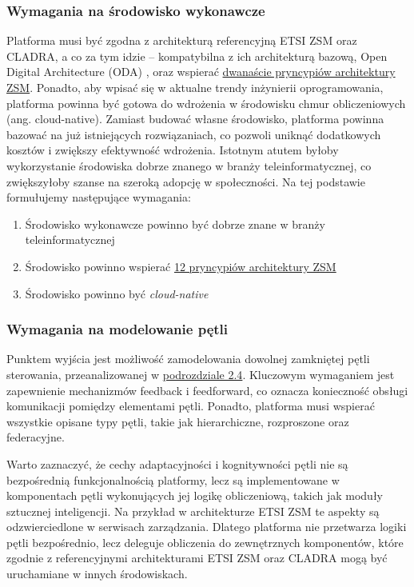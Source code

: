 \subsubsection{Wymagania na środowisko wykonawcze}

Platforma musi być zgodna z architekturą referencyjną ETSI ZSM oraz CLADRA, a co za tym idzie – kompatybilna z ich architekturą bazową, Open Digital Architecture (ODA) \cite{tmforum2018}, oraz wspierać \hyperlink{sec:zsm}{dwanaście pryncypiów architektury ZSM}. Ponadto, aby wpisać się w aktualne trendy inżynierii oprogramowania, platforma powinna być gotowa do wdrożenia w środowisku chmur obliczeniowych (ang. cloud-native). Zamiast budować własne środowisko, platforma powinna bazować na już istniejących rozwiązaniach, co pozwoli uniknąć dodatkowych kosztów i zwiększy efektywność wdrożenia. Istotnym atutem byłoby wykorzystanie środowiska dobrze znanego w branży teleinformatycznej, co zwiększyłoby szanse na szeroką adopcję w społeczności. Na tej podstawie formułujemy następujące wymagania:

\begin{enumerate}
    \setcounter{enumi}{0} 
    \item \label{req:1} Środowisko wykonawcze powinno być dobrze znane w branży teleinformatycznej
    \item \label{req:2} Środowisko powinno wspierać \hyperlink{list:2}{12 pryncypiów architektury ZSM}
    \item \label{req:3} Środowisko powinno być \textit{cloud-native}
\end{enumerate}

\subsubsection{Wymagania na modelowanie pętli}

Punktem wyjścia jest możliwość zamodelowania dowolnej zamkniętej pętli sterowania, przeanalizowanej w \hyperlink{sec:25}{podrozdziale 2.4}. Kluczowym wymaganiem jest zapewnienie mechanizmów feedback i feedforward, co oznacza konieczność obsługi komunikacji pomiędzy elementami pętli. Ponadto, platforma musi wspierać wszystkie opisane typy pętli, takie jak hierarchiczne, rozproszone oraz federacyjne.

Warto zaznaczyć, że cechy adaptacyjności i kognitywności pętli nie są bezpośrednią funkcjonalnością platformy, lecz są implementowane w komponentach pętli wykonujących jej logikę obliczeniową, takich jak moduły sztucznej inteligencji. Na przykład w architekturze ETSI ZSM te aspekty są odzwierciedlone w serwisach zarządzania. Dlatego platforma nie przetwarza logiki pętli bezpośrednio, lecz deleguje obliczenia do zewnętrznych komponentów, które zgodnie z referencyjnymi architekturami ETSI ZSM oraz CLADRA mogą być uruchamiane w innych środowiskach.

